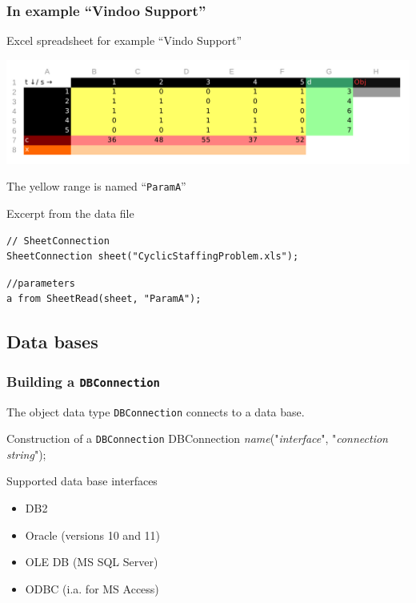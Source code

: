 \begin{frame}[fragile]
 \frametitle{In example ``Vindoo Support''}
 \begin{block}{Excel spreadsheet for example ``Vindo Support''}
  \begin{center}
   \includegraphics[width=.9\linewidth]{Bilder/CyclicStaffingData}
  \end{center}\vspace{-1\baselineskip}
  The yellow range is named ``\texttt{ParamA}''
 \end{block}
 \begin{block}{Excerpt from the data file}
\begin{lstlisting}[language=opldata,numbers=none,basicstyle=\ttfamily\scriptsize]
// SheetConnection
SheetConnection sheet("CyclicStaffingProblem.xls");
\end{lstlisting}\vspace{-2\baselineskip}
\begin{lstlisting}[language=opldata,numbers=none,basicstyle=\ttfamily\scriptsize]
//parameters
a from SheetRead(sheet, "ParamA");
\end{lstlisting}
 \end{block}
\end{frame}

\subsection{Data bases}
\begin{frame}
 \frametitle{Building a \texttt{DBConnection}}
 The object data type \texttt{DBConnection} connects to a data base.
 \begin{block}{Construction of a \texttt{DBConnection}}
  \ttfamily
  DBConnection \textsf{\slshape name}("\textsf{\slshape interface}", "\textsf{\slshape connection string}");
 \end{block}
 \begin{block}{Supported data base interfaces}
  \begin{itemize}
   \item DB2
   \item Oracle (versions 10 and 11)
   \item OLE DB (MS SQL Server)
   \item ODBC (i.a. for MS Access)
  \end{itemize}
 \end{block}
\end{frame}

